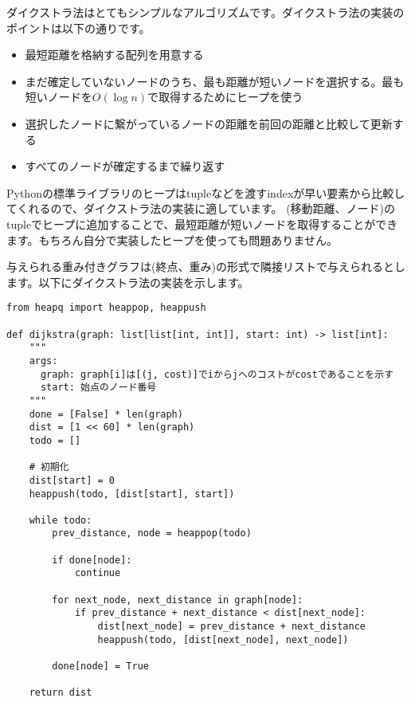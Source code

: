 \documentclass{jlreq}
\begin{document}
\vspace{0.5cm}

ダイクストラ法はとてもシンプルなアルゴリズムです。ダイクストラ法の実装のポイントは以下の通りです。

\begin{itemize}
  \item 最短距離を格納する配列を用意する
  \item まだ確定していないノードのうち、最も距離が短いノードを選択する。最も短いノードを$O(\log n)$で取得するためにヒープを使う
  \item 選択したノードに繋がっているノードの距離を前回の距離と比較して更新する
  \item すべてのノードが確定するまで繰り返す
\end{itemize}

Pythonの標準ライブラリのヒープはtupleなどを渡すindexが早い要素から比較してくれるので、ダイクストラ法の実装に適しています。
(移動距離、ノード)のtupleでヒープに追加することで、最短距離が短いノードを取得することができます。もちろん自分で実装したヒープを使っても問題ありません。

与えられる重み付きグラフは(終点、重み)の形式で隣接リストで与えられるとします。以下にダイクストラ法の実装を示します。
\begin{lstlisting}[caption=ダイクストラ法の実装, label=dijkstra, frame=TRBL, label={dijkstra}]
from heapq import heappop, heappush

def dijkstra(graph: list[list[int, int]], start: int) -> list[int]:
    """
    args:
      graph: graph[i]は[(j, cost)]でiからjへのコストがcostであることを示す
      start: 始点のノード番号
    """
    done = [False] * len(graph)
    dist = [1 << 60] * len(graph)
    todo = []
    
    # 初期化
    dist[start] = 0
    heappush(todo, [dist[start], start])
    
    while todo:
        prev_distance, node = heappop(todo)
        
        if done[node]:
            continue
        
        for next_node, next_distance in graph[node]:
            if prev_distance + next_distance < dist[next_node]:
                dist[next_node] = prev_distance + next_distance
                heappush(todo, [dist[next_node], next_node])
        
        done[node] = True 
    
    return dist
\end{lstlisting}
\end{document}
